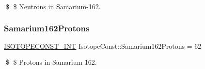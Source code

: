 \$ \$ Neutrons in Samarium-\/162. \mbox{\label{group___isotope_const-_samarium-_sm162_ga2c2af5b1162061122ba37ddcf2151baa}} 
\subsubsection{\texorpdfstring{Samarium162\+Protons}{Samarium162Protons}}
{\footnotesize\ttfamily \mbox{\hyperlink{group___isotope_const-_macros_ga5f18360b3e99483a35c32d789e62621c}{I\+S\+O\+T\+O\+P\+E\+C\+O\+N\+S\+T\+\_\+\+I\+NT}} Isotope\+Const\+::\+Samarium162\+Protons = 62}

\$ \$ Protons in Samarium-\/162. 